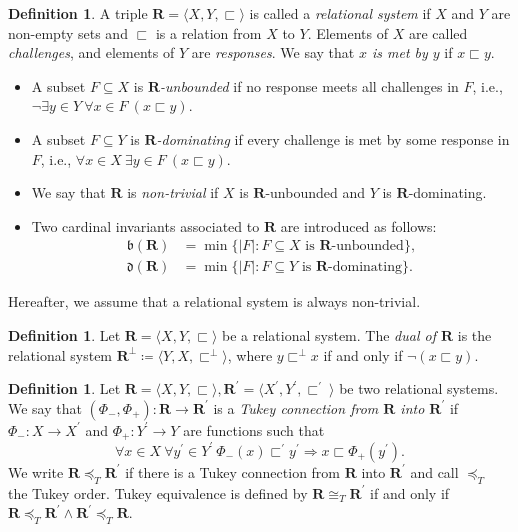 \documentclass[a4paper,12pt]{amsart}
\theoremstyle{definition}
\newtheorem{dfn}[thm]{Definition}
\numberwithin{thm}{section}
\numberwithin{equation}{section}
\newcommand{\bb}{\mathfrak{b}}
\newcommand{\dd}{\mathfrak{d}}
\newcommand{\R}{\mathbf{R}}
\begin{document}
    \begin{dfn}\leavevmode
        A triple $\R=\langle X, Y, \sqsubset\rangle$ is called a \emph{relational system} if $X$ and $Y$ are non-empty sets and $\sqsubset$ is a relation from $X$ to $Y$. Elements of $X$ are called \emph{challenges}, and elements of $Y$ are \emph{responses}. We say that \emph{$x$ is met by $y$} if $x\sqsubset y$.
    	\begin{itemize}
    		\item A subset $F\subseteq X$ is \emph{$\R$-unbounded} if no response meets all challenges in $F$, i.e., $\neg\exists y\in Y~\forall x\in F~(x\sqsubset y)$.
    		\item A subset $F\subseteq Y$ is \emph{$\R$-dominating} if every challenge is met by some response in $F$, i.e., $\forall x\in X~\exists y\in F~(x\sqsubset y)$.
    		\item We say that $\R$ is \emph{non-trivial} if $X$ is $\R$-unbounded and $Y$ is $\R$-dominating.
            \item Two cardinal invariants associated to $\R$ are introduced as follows:
    		\begin{align*}
    			\bb(\R) &= \min\{|F|\colon F\subseteq X \text{ is }\R\text{-unbounded}\},\\
    			\dd(\R) &= \min\{|F|\colon F\subseteq Y \text{ is }\R\text{-dominating}\}.
    		\end{align*}	
    	\end{itemize}	
    \end{dfn}
    
    Hereafter, we assume that a relational system is always non-trivial.
    		
    \begin{dfn}
        Let $\R=\langle X,Y,\sqsubset\rangle$ be a relational system. The \emph{dual of $\R$} is the relational system $\R^\bot\coloneq\langle Y,X,\sqsubset^\bot\rangle$, where $y\sqsubset^\bot x$ if and only if $\lnot(x\sqsubset y)$.
    \end{dfn}
    		
    \begin{dfn}\label{dfn:Tukey_connection}
    	Let $\R=\langle X,Y,\sqsubset \rangle, \R^{\prime}=\langle X^{\prime},Y^{\prime},\sqsubset^{\prime}~\rangle$ be two relational systems. We say that $(\Phi_-,\Phi_+)\colon\R\rightarrow\R^\prime$ is a \emph{Tukey connection from $\R$ into $\R^{\prime}$} if $\Phi_-\colon X\rightarrow X^{\prime}$ and $\Phi_+\colon Y^{\prime}\rightarrow Y$ are functions such that
    	\begin{equation*}
    		\forall x\in X~\forall y^{\prime}\in Y^{\prime}~\Phi_-(x)\sqsubset^{\prime} y^{\prime}\Rightarrow x \sqsubset \Phi_{+} (y^{\prime}).
    	\end{equation*}
    	We write $\R\preceq_T\R^{\prime}$ if there is a Tukey connection from $\R$ into $\R^{\prime}$ and call $\preceq_T$ the Tukey order. Tukey equivalence is defined by $\R\cong_T\R^{\prime}$ if and only if $\R\preceq_T\R^{\prime}\land \R^{\prime}\preceq_T\R$.
    \end{dfn}
    		
\end{document}
